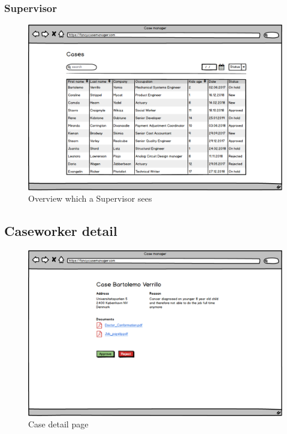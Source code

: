 \newpage
\subsubsection{Supervisor}
\begin{figure}[htb!]
    \centering
    \includegraphics[width=\textwidth]{img/page-supervisor-overview.png}
    \caption{Overview which a Supervisor sees}
\end{figure}

\newpage
\subsection{Caseworker detail}
\begin{figure}[htb!]
    \centering
    \includegraphics[width=\textwidth]{img/page-case-detail.png}
    \caption{Case detail page}
\end{figure}

\newpage
